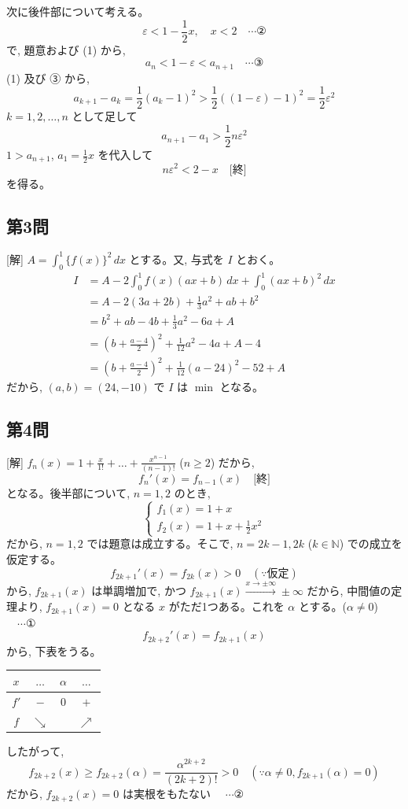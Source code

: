 \documentclass[../main.tex]{subfiles}
\begin{document}
次に後件部について考える。
\[
  \varepsilon < 1 - \frac{1}{2}x, \quad x < 2 \quad \cdots \text{②}
\]
で, 題意および (1) から,
\[
  a_n < 1 - \varepsilon < a_{n+1} \quad \cdots \text{③}
\]
(1) 及び ③ から,
\[
  a_{k+1} - a_k = \frac{1}{2}(a_k - 1)^2 > \frac{1}{2} \left( (1 - \varepsilon) - 1 \right)^2 = \frac{1}{2} \varepsilon^2
\]
$k=1, 2, \dots, n$ として足して
\[
  a_{n+1} - a_1 > \frac{1}{2} n \varepsilon^2
\]
$1 > a_{n+1}$, $a_1 = \frac{1}{2}x$ を代入して
\[
  n \varepsilon^2 < 2 - x \quad \text{[終]}
\]
を得る。

\subsection*{第3問}

[解] $A = \int_0^1 \{f(x)\}^2 \, dx$ とする。又, 与式を $I$ とおく。
\[
  \begin{aligned}
    I &= A - 2 \int_0^1 f(x) (ax+b) \, dx + \int_0^1 (ax+b)^2 \, dx \\
    &= A - 2 (3a + 2b) + \frac{1}{3} a^2 + ab + b^2 \\
    &= b^2 + ab - 4b + \frac{1}{3} a^2 - 6a + A \\
    &= \left( b + \frac{a-4}{2} \right)^2 + \frac{1}{12} a^2 - 4a + A - 4 \\
    &= \left( b + \frac{a-4}{2} \right)^2 + \frac{1}{12} (a-24)^2 - 52 + A
  \end{aligned}
\]
だから, $(a,b) = (24, -10)$ で $I$ は $\min$ となる。

\subsection*{第4問}

[解] $f_n(x) = 1 + \frac{x}{1!} + \dots + \frac{x^{n-1}}{(n-1)!}$ ($n \ge 2$) だから,
\[
  f_n'(x) = f_{n-1}(x) \quad \text{[終]}
\]
となる。後半部について, $n=1, 2$ のとき,
\[
  \begin{cases}
    f_1(x) = 1 + x \\
    f_2(x) = 1 + x + \frac{1}{2} x^2
  \end{cases}
\]
だから, $n=1, 2$ では題意は成立する。そこで, $n=2k-1, 2k$ ($k \in \mathbb{N}$) での成立を仮定する。
\[
  f_{2k+1}'(x) = f_{2k}(x) > 0 \quad (\because \text{仮定})
\]
から, $f_{2k+1}(x)$ は単調増加で, かつ $f_{2k+1}(x) \xrightarrow{x \to \pm \infty} \pm \infty$ だから, 中間値の定理より, $f_{2k+1}(x) = 0$ となる $x$ がただ1つある。これを $\alpha$ とする。($\alpha \neq 0$) $\quad \cdots \text{①}$
\[
  f_{2k+2}'(x) = f_{2k+1}(x)
\]
から, 下表をうる。
\begin{center}
  \begin{tabular}{c|c|c|c}
    $x$ & $\dots$ & $\alpha$ & $\dots$ \\ \hline
    $f'$ & $-$ & $0$ & $+$ \\ \hline
    $f$ & $\searrow$ & & $\nearrow$
  \end{tabular}
\end{center}
したがって,
\[
  f_{2k+2}(x) \ge f_{2k+2}(\alpha) = \frac{\alpha^{2k+2}}{(2k+2)!} > 0 \quad (\because \alpha \neq 0, f_{2k+1}(\alpha) = 0)
\]
だから, $f_{2k+2}(x) = 0$ は実根をもたない $\quad \cdots \text{②}$
\end{document}
